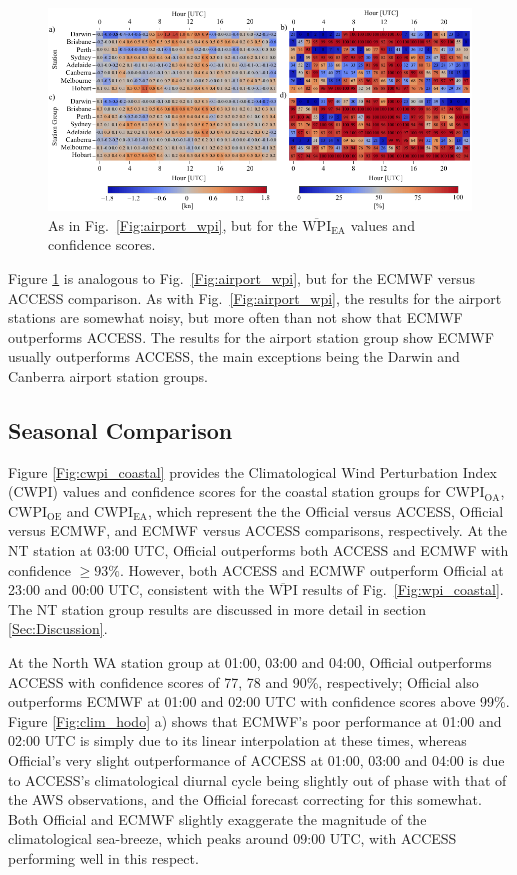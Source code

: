 \documentclass[twocol]{ametsoc}
\begin{document}
\begin{figure}
\centering
\includegraphics[width=39pc]{airport_wpi_EA.pdf}
\caption{As in Fig.~\ref{Fig:airport_wpi}, but for the $\overline{\text{WPI}}_\text{EA}$ values and confidence scores.}
\label{Fig:airport_wpi_EA}
\end{figure}

Figure \ref{Fig:airport_wpi_EA} is analogous to Fig.~\ref{Fig:airport_wpi}, but for the ECMWF versus ACCESS comparison. As with Fig.~\ref{Fig:airport_wpi}, the results for the airport stations are somewhat noisy, but more often than not show that ECMWF outperforms ACCESS. The results for the airport station group show ECMWF usually outperforms ACCESS, the main exceptions being the Darwin and Canberra airport station groups.  

\subsection{Seasonal Comparison}
\label{Sec:Seasonal}
Figure \ref{Fig:cwpi_coastal} provides the Climatological Wind Perturbation Index (CWPI) values and confidence scores for the coastal station groups for $\text{CWPI}_\text{OA}$, $\text{CWPI}_\text{OE}$ and $\text{CWPI}_\text{EA}$, which represent the the Official versus ACCESS, Official versus ECMWF, and ECMWF versus ACCESS comparisons, respectively. At the NT station at 03:00 UTC, Official outperforms both ACCESS and ECMWF with confidence $\geq 93\%$. However, both ACCESS and ECMWF outperform Official at 23:00 and 00:00 UTC, consistent with the $\overline{\text{WPI}}$ results of Fig.~\ref{Fig:wpi_coastal}. The NT station group results are discussed in more detail in section \ref{Sec:Discussion}.

At the North WA station group at 01:00, 03:00 and 04:00, Official outperforms ACCESS with confidence scores of 77, 78 and 90\%, respectively; Official also outperforms ECMWF at 01:00 and 02:00 UTC with confidence scores above 99\%. Figure \ref{Fig:clim_hodo} a) shows that ECMWF's poor performance at 01:00 and 02:00 UTC is simply due to its linear interpolation at these times, whereas Official's very slight outperformance of ACCESS at 01:00, 03:00 and 04:00 is due to ACCESS's climatological diurnal cycle being slightly out of phase with that of the AWS observations, and the Official forecast correcting for this somewhat. Both Official and ECMWF slightly exaggerate the magnitude of the climatological sea-breeze, which peaks around 09:00 UTC, with ACCESS performing well in this respect.
\end{document}
